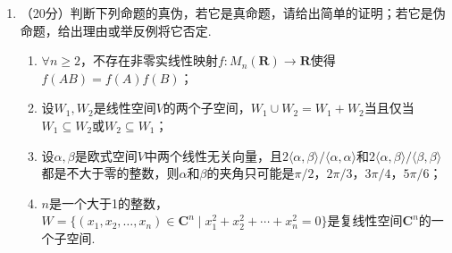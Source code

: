 \begin{enumerate}
    \item （20分）判断下列命题的真伪，若它是真命题，请给出简单的证明；若它是伪命题，给出理由或举反例将它否定.
    \begin{enumerate}
        \item $\forall n\geqslant 2$，不存在非零实线性映射$f\colon M_n(\mathbf{R})\to\mathbf{R}$使得$f(AB)=f(A)f(B)$；

        \item 设$W_1,W_2$是线性空间$V$的两个子空间，$W_1\cup W_2=W_1+W_2$当且仅当$W_1\subseteq W_2$或$W_2\subseteq W_1$；

        \item 设$\alpha,\beta$是欧式空间$V$中两个线性无关向量，且${2\langle\alpha,\beta\rangle}/{\langle\alpha,\alpha\rangle}$和${2\langle\alpha,\beta\rangle}/{\langle\beta,\beta\rangle}$都是不大于零的整数，则$\alpha$和$\beta$的夹角只可能是${\pi}/{2}$，${2\pi}/{3}$，${3\pi}/{4}$，${5\pi}/{6}$；

        \item $n$是一个大于1的整数，$W=\{(x_1,x_2,\ldots,x_n)\in\mathbf{C}^n\mid x_1^2+x_2^2+\cdots+x_n^2=0\}$是复线性空间$\mathbf{C}^n$的一个子空间.
    \end{enumerate}
\end{enumerate}

\clearpage
